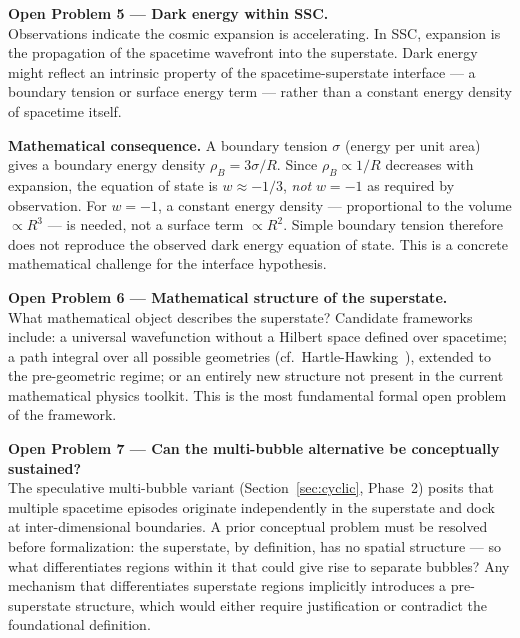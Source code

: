 \documentclass[12pt,a4paper]{article}
\begin{document}
\begin{openbox}
\textbf{Open Problem 5 — Dark energy within SSC.}\\
Observations indicate the cosmic expansion is accelerating.  In SSC,
expansion is the propagation of the spacetime wavefront into the
superstate.  Dark energy might reflect an intrinsic property of the
spacetime-superstate interface — a boundary tension or surface energy
term — rather than a constant energy density of spacetime itself.

\textbf{Mathematical consequence.}  A boundary tension $\sigma$ (energy per unit
area) gives a boundary energy density $\rho_B = 3\sigma/R$.  Since
$\rho_B \propto 1/R$ decreases with expansion, the equation of state is
$w \approx -1/3$, \emph{not} $w = -1$ as required by observation.  For
$w = -1$, a constant energy density — proportional to the volume
$\propto R^3$ — is needed, not a surface term $\propto R^2$.  Simple
boundary tension therefore does not reproduce the observed dark energy
equation of state.  This is a concrete mathematical challenge for the
interface hypothesis.
\end{openbox}

\begin{openbox}
\textbf{Open Problem 6 — Mathematical structure of the superstate.}\\
What mathematical object describes the superstate?  Candidate
frameworks include: a universal wavefunction without a Hilbert space
defined over spacetime; a path integral over all possible geometries
(cf.\ Hartle-Hawking~\citep{hartle1983}), extended to the pre-geometric
regime; or an entirely new structure not present in the current
mathematical physics toolkit.  This is the most fundamental formal
open problem of the framework.
\end{openbox}

\begin{openbox}
\textbf{Open Problem 7 — Can the multi-bubble alternative be conceptually sustained?}\\
The speculative multi-bubble variant (Section~\ref{sec:cyclic},
Phase~2) posits that multiple spacetime episodes originate
independently in the superstate and dock at inter-dimensional
boundaries.  A prior conceptual problem must be resolved before
formalization: the superstate, by definition, has no spatial
structure — so what differentiates regions within it that could
give rise to separate bubbles?  Any mechanism that differentiates
superstate regions implicitly introduces a pre-superstate structure,
which would either require justification or contradict the foundational
definition.
\end{openbox}
\end{document}
